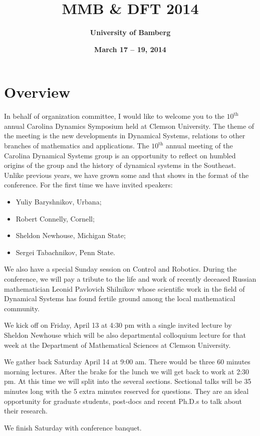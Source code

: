 \documentclass[a4paper,10pt,foldmark]{leaflet}
\title{\bf MMB \& DFT 2014}
\author{%
\Large \bf University of Bamberg
}
\date{\bf March 17 -- 19, 2014 }
\begin{document}
\maketitle
\section{Overview} In behalf of organization committee, I would like
to welcome you to the $10^{\mbox{th}}$ annual Carolina Dynamics
Symposium held at Clemson University. The theme of the meeting is the
new developments in Dynamical Systems, relations to other branches of
mathematics and applications. The $10^{\mbox{th}}$ annual meeting of the
Carolina Dynamical Systems group is an opportunity to reflect on humbled
origins of the group and the history of dynamical systems in the
Southeast. Unlike previous years, we have grown some and that shows in
the format of the conference. For the first time we have invited
speakers:

\begin{itemize}
\item Yuliy Baryshnikov, Urbana;
\item Robert Connelly, Cornell;
\item Sheldon Newhouse, Michigan State;
\item Sergei Tabachnikov, Penn State.
\end{itemize}

We also have a special Sunday session on Control and Robotics. During
the conference, we will pay a tribute to the life and work of recently
deceased Russian mathematician Leonid Pavlovich Shilnikov whose
scientific work in the field of Dynamical Systems has found fertile
ground among the local mathematical community.


We kick off on Friday, April 13 at 4:30 pm with a single invited lecture
by Sheldon Newhouse which will be also departmental colloquium lecture
for that week at the Department of Mathematical Sciences at Clemson
University.


We gather back Saturday April 14 at 9:00 am. There would be three 60
minutes morning lectures. After the brake for the lunch we will get back
to work at 2:30 pm. At this time we will split into the several
sections. Sectional talks will be 35 minutes long with the 5 extra
minutes reserved for questions. They are an ideal opportunity for
graduate students, post-docs and recent Ph.D.s to talk about their
research.


We finish Saturday with conference banquet.
\end{document}
